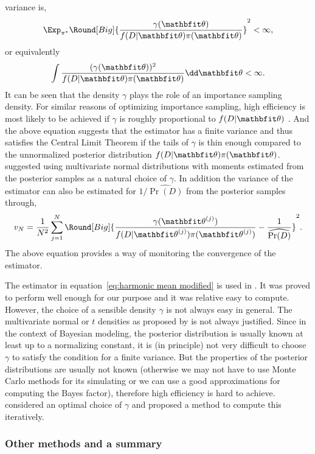 variance is,
\begin{equation}
  \Exp_{\pi^*}\Round[Big]{\frac{\gamma(\bth)}{f(D|\bth)\pi(\bth)}}^2 < \infty,
\end{equation}
or equivalently
\begin{equation}
  \int \frac{(\gamma(\bth))^2}{f(D|\bth)\pi(\bth)}\dd\bth < \infty.
\end{equation}
It can be seen that the density $\gamma$ plays the role of an importance
sampling density. For similar reasons of optimizing importance sampling, high
efficiency is most likely to be achieved if $\gamma$ is roughly proportional
to $f(D|\bth)$ \parencite{Kass:1995vb}. And the above equation suggests that the
estimator has a finite variance and thus satisfies the Central Limit Theorem
if the tails of $\gamma$ is thin enough compared to the unnormalized posterior
distribution $f(D|\bth)\pi(\bth)$. \textcite{Gelfand1994} suggested using
multivariate normal distributions with moments estimated from the posterior
samples as a natural choice of $\gamma$. In addition the variance of the
estimator can also be estimated for $1/\widehat{\Pr(D)}$ from the posterior
samples through,
\begin{equation}
  v_N = \frac{1}{N^2}\sum_{j=1}^N \Round[Big]{
    \frac{\gamma(\bth^{(j)})}{f(D|\bth^{(j)})\pi(\bth^{(j)})}
    - \frac{1}{\widehat{\Pr(D)}}}^2.
\end{equation}
The above equation provides a way of monitoring the convergence of the
estimator.

The estimator in equation~\eqref{eq:harmonic mean modified} is used in
\textcite{Zhou:2011uo}. It was proved to perform well enough for our purpose and
it was relative easy to compute. However, the choice of a sensible density
$\gamma$ is not always easy in general. The multivariate normal or $t$
densities as proposed by \textcite{Gelfand1994} is not always justified. Since
in the context of Bayesian modeling, the posterior distribution is usually
known at least up to a normalizing constant, it is (in principle) not very
difficult to choose $\gamma$ to satisfy the condition for a finite variance.
But the properties of the posterior distributions are usually not known
(otherwise we may not have to use Monte Carlo methods for its simulating or we
can use a good approximations for computing the Bayes factor), therefore high
efficiency is hard to achieve. \textcite{Meng:1996wj} considered an optimal
choice of $\gamma$ and proposed a method to compute this iteratively.

\subsubsection{Other methods and a summary}
\label{ssub:Other methods and a summary a}


